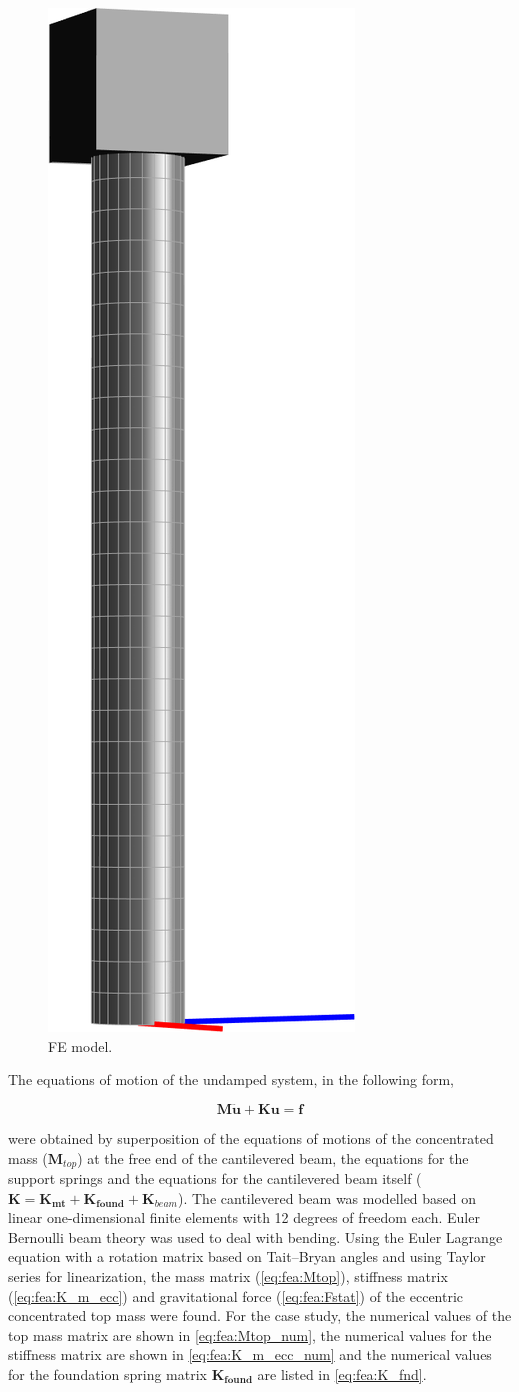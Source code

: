 \documentclass{article}
\begin{document}
\begin{figure}[ht]
    \centering
    \includegraphics[width=0.15\linewidth]{figures/FEModel.png}
    \caption{FE model.}
    \label{fig:fea:model}
\end{figure}

The equations of motion of the undamped system, in the following form,

\begin{equation}
    \mathbf{M\ddot{\mathbf{u}}}+\mathbf{K}\mathbf{u} = \mathbf{f}
    \label{eq:fea:system}
\end{equation}

were obtained by superposition of the equations of motions of the concentrated mass ($\mathbf{M}_{top}$) at the free end of the cantilevered beam, the equations for the support springs and the equations for the cantilevered beam itself ($\mathbf{K} = \mathbf{K_{mt}} + \mathbf{K_{found}}+\mathbf{K}_{beam}$). The cantilevered beam was modelled based on linear one-dimensional finite elements with 12 degrees of freedom each. Euler Bernoulli beam theory was used to deal with bending. Using the Euler Lagrange equation with a rotation matrix based on Tait–Bryan angles and using Taylor series for linearization,  the mass matrix (\autoref{eq:fea:Mtop}), stiffness matrix (\autoref{eq:fea:K_m_ecc}) and gravitational force (\autoref{eq:fea:Fstat}) of the eccentric concentrated top mass were found. For the case study, the numerical values of the top mass matrix are shown in \autoref{eq:fea:Mtop_num}, the numerical values for the stiffness matrix are shown in \autoref{eq:fea:K_m_ecc_num} and the numerical values for the foundation spring matrix $\mathbf{K_{found}}$ are listed in \autoref{eq:fea:K_fnd}.
\end{document}
